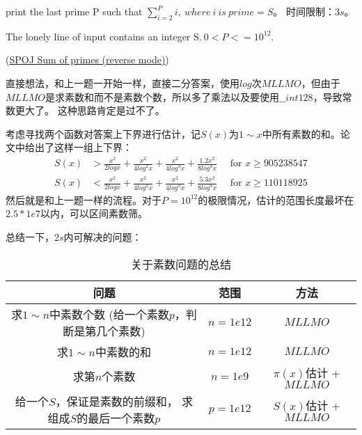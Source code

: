 \begin{example}
	print the last prime P such that $\sum_{i=2}^Pi,\ where\ i \ is\ prime = S$。 时间限制：$3s$。
	
	The lonely line of input contains an integer S.$\ 0 < P <= 10^{12}$.
	
	(\href{https://www.spoj.com/problems/SUMPRIM2/}{SPOJ Sum of primes (reverse mode)})
\end{example}
\begin{solution}
	直接想法，和上一题一开始一样，直接二分答案，使用$log$次$MLLMO$，但由于$MLLMO$是求素数和而不是素数个数，所以多了乘法以及要使用$\_\_int128$，导致常数更大了。
	这种思路肯定是过不了。
	
	考虑寻找两个函数对答案上下界进行估计，记$S(x)$为$1\sim x$中所有素数的和。论文\cite{Axler2014On}中给出了这样一组上下界：
	$$
	\begin{aligned} S(x) & > \frac{x^2}{2logx} + \frac{x^2}{4log^2x} + \frac{x^2}{4log^3x} + \frac{1.2x^2}{8log^4x} \quad \text { for } x \geqslant 905238547 \\ S(x) & < \frac{x^2}{2logx} + \frac{x^2}{4log^2x} + \frac{x^2}{4log^3x} + \frac{5.3x^2}{8log^4x} \quad \text { for } x \geqslant 110118925 \end{aligned}
	$$
	然后就是和上一题一样的流程。对于$P=10^{12}$的极限情况，估计的范围长度最坏在$2.5*1e7$以内，可以区间素数筛。
	
\end{solution}



\vbox{}

\begin{note}
	总结一下，$2s$内可解决的问题：
		\begin{table}[!htbp]
			\centering
			\caption{关于素数问题的总结 \label{tab:summaryforprime}}
			\begin{spacing}{1}
				\begin{tabular}{|c|c|c|}
					\toprule[1pt]
					问题 & 范围 & 方法 \\
					\midrule[1.5pt]
					\tabincell{c}{求$1\sim n$中素数个数 \\ (给一个素数$p$，判断是第几个素数)} &   $n= 1e12$ &  $MLLMO$ \\
					\midrule[1pt]
					求$1\sim n$中素数的和 &  $n=1e12$ & $MLLMO$  \\
					\midrule[1pt]
					求第$n$个素数  &  $n=1e9 $ &  $\pi(x)$估计 + $MLLMO$ \\
					\midrule[1pt]
					\tabincell{c}{给一个$S$，保证是素数的前缀和， \\ 求组成$S$的最后一个素数$p$}  &   $p=1e12$ &  $S(x)$估计 + $MLLMO$ \\
					\bottomrule[1pt]
				\end{tabular}%
			\end{spacing}
		\end{table}%
\end{note}


